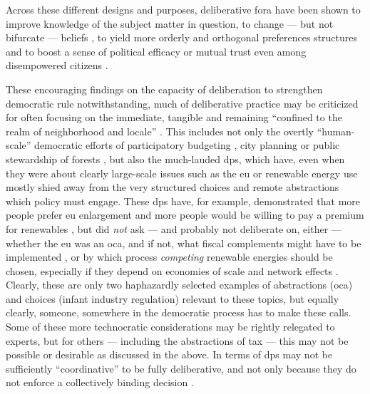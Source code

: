 
Across these different designs and purposes, deliberative fora have been shown to improve knowledge of the subject matter in question, to change --- but not bifurcate --- beliefs \citep{Fishkin2009}, to yield more orderly and orthogonal preferences structures \citep{Farrar2003} and to boost a sense of political efficacy or mutual trust even among disempowered citizens \citep{Karpowitz2009}.

These encouraging findings on the capacity of deliberation to strengthen democratic rule notwithstanding, much of deliberative practice may be criticized for often focusing on the immediate, tangible and remaining ``confined to the realm of neighborhood and locale'' \citep[17]{FungWright-2001-aa}.
This includes not only the overtly ``human-scale'' democratic efforts \citep[759]{Boggs-1997-aa} of participatory budgeting \citep{Sousa-Santos-1998-aa}, city planning \citep{Sokoloff2005} or public stewardship of forests \citep{Cheng2005}, but also the much-lauded \glspl{dp}, which have, even when they were about clearly large-scale issues such as the \gls{eu} \citep{Fishkin2009} or renewable energy use \citep{LehrGuild-2003-aa} mostly shied away from the very structured choices and remote abstractions which policy must engage.
These \glspl{dp} have, for example, demonstrated that more people prefer \gls{eu} enlargement and more people would be willing to pay a premium for renewables \citep[157]{Fishkin2009}, but did \emph{not} ask --- and probably not deliberate on, either --- whether the \gls{eu} was an \gls{oca}, and if not, what fiscal complements might have to be implemented \citep[for example,][]{Mundell1961}, or by which process \emph{competing} renewable energies should be chosen, especially if they depend on economies of scale and network effects \citep[for example, ][]{Krugman-1990-aa}.
Clearly, these are only two haphazardly selected examples of abstractions (\gls{oca}) and choices (infant industry regulation) relevant to these topics, but equally clearly, someone, somewhere in the democratic process has to make these calls.
Some of these more technocratic considerations may be rightly relegated to experts, but for others --- including the abstractions of tax --- this may not be possible or desirable as discussed in the above.
In terms of \citeauthor{Landwehr2010} \glspl{dp} may not be sufficiently ``coordinative'' to be fully deliberative, and not only because they do not enforce a collectively binding decision \citeyearpar[377]{Landwehr2010}.
